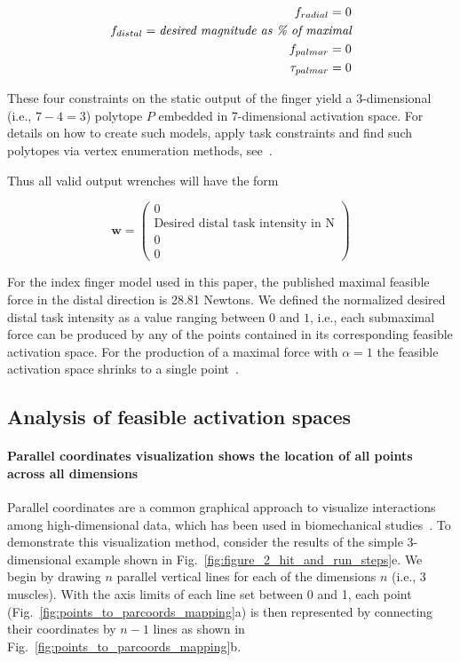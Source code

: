 \documentclass[9pt,twocolumn,twoside,lineno]{pnas-new}
\begin{document}
{\begin{eqnarray}
f_{radial} = 0 \\
f_{distal} = \emph{desired magnitude as \% of maximal} \\
f_{palmar} = 0 \\
\tau_{palmar} = 0
\end{eqnarray}

These four constraints on the static output of the finger yield a 3-dimensional (i.e., $7-4=3$) polytope $P$ embedded in 7-dimensional activation space.
For details on how to create such models, apply task constraints and find such polytopes via vertex enumeration methods, see~\cite{valero-cuevas2015fundamentals}.

Thus all valid output wrenches will have the form

\begin{equation}
\label{eq:wrench}
\textbf{w}=
\begin{pmatrix}
0\\
\text{Desired distal task intensity in N} \\
0\\
0
\end{pmatrix}
\end{equation}

For the index finger model used in this paper, the published maximal feasible force in the distal direction is 28.81 Newtons. We defined the normalized desired distal task intensity as a value ranging between $0$ and $1$, i.e., each submaximal force can be produced by any of the points contained in its corresponding feasible activation space. For the production of a maximal force with $\alpha=1$ the feasible activation space shrinks to a single point~\cite{spoor1983balancing,Chao1978Graphical,chvatal1983linear,Valero-Cuevas2000Scaling}.

\subsection*{Analysis of feasible activation spaces}
\paragraph*{Parallel coordinates visualization shows the location of all points across all dimensions}

Parallel coordinates are a common graphical approach to visualize interactions among high-dimensional data, which has been used in biomechanical studies~\cite{bachynskyi2013biomechanical, krekel2010visual}.
To demonstrate this visualization method, consider the results of the simple 3-dimensional example shown in Fig.~\ref{fig:figure_2_hit_and_run_steps}e. We begin by drawing $n$ parallel vertical lines for each of the dimensions $n$ (i.e., 3 muscles).
With the axis limits of each line set between 0 and 1, each point (Fig.~\ref{fig:points_to_parcoords_mapping}a) is then represented by connecting their coordinates by $n-1$ lines as shown in Fig.~\ref{fig:points_to_parcoords_mapping}b.

}
\end{document}
